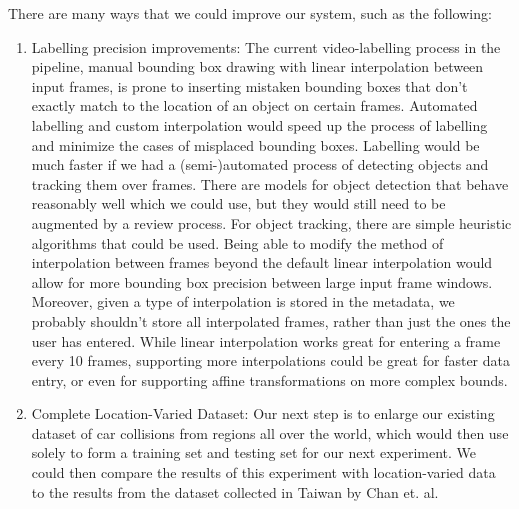 \documentclass[letterpaper, 10 pt, conference]{IEEEconf}
\begin{document}
There are many ways that we could improve our system, such as the following:
\begin{enumerate}
\item Labelling precision improvements: The current video-labelling process in the pipeline, manual bounding box drawing with linear interpolation between input frames, is prone to inserting mistaken bounding boxes that don't exactly match to the location of an object on certain frames. Automated labelling and custom interpolation would speed up the process of labelling and minimize the cases of misplaced bounding boxes. Labelling would be much faster if we had a (semi-)automated process of detecting objects and tracking them over frames. There are models for object detection that behave reasonably well which we could use, but they would still need to be augmented by a review process. For object tracking, there are simple heuristic algorithms that could be used. Being able to modify the method of interpolation between frames beyond the default linear interpolation would allow for more bounding box precision between large input frame windows. Moreover, given a type of interpolation is stored in the metadata, we probably shouldn't store all interpolated frames, rather than just the ones the user has entered. While linear interpolation works great for entering a frame every 10 frames, supporting more interpolations could be great for faster data entry, or even for supporting affine transformations on more complex bounds.

\item Complete Location-Varied Dataset: Our next step is to enlarge our existing dataset of car collisions from regions all over the world, which would then use solely to form a training set and testing set for our next experiment. We could then compare the results of this experiment with location-varied data to the results from the dataset collected in Taiwan by Chan et. al.

\end{enumerate}

\addtolength{\textheight}{-12cm}



\nocite{*}
\printbibliography
\end{document}
